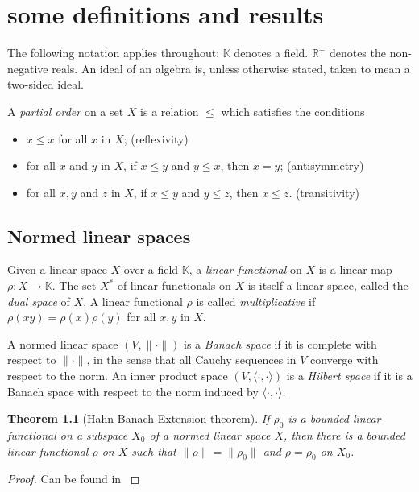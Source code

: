 \documentclass[12pt,a4paper]{report}
\theoremstyle{plain}
\newtheorem*{thm*}{Theorem}
\theoremstyle{definition}
\newcommand{\1}{\mathbbm{1}}
\newcommand{\R}{\mathbb{R}}
\renewcommand{\H}{\mathcal{H}}
\newcommand{\B}{\mathcal{B}}
\newcommand{\BH}{\mathcal{\B(\H)}}
\begin{document}


\chapter{some definitions and results}


The following notation applies throughout:
$\mathbb{K}$ denotes a field. $\R^+$ denotes the non-negative reals. An ideal of an algebra is, unless otherwise stated, taken to mean a two-sided ideal. 

A \emph{partial order} on a set $X$ is a relation $\leq$ which satisfies the conditions
\begin{itemize}
	\item $x \leq x$ for all $x$ in $X$; 		\hfill (reflexivity)
	\item for all $x$ and $y$ in $X$, if $x \leq y$ and $y\leq x$, then $x=y$; 
												\hfill (antisymmetry)
	\item for all $x,y$ and $z$ in $X$, if $x \leq y$ and $y\leq z$, then $x\leq z$. 
												\hfill (transitivity)
\end{itemize}

\section{Normed linear spaces}

Given a linear space $X$ over a field $\mathbb K$, a \emph{linear functional} on $X$ is a linear map 
$\rho:X\to\mathbb K$. The set $X^\ast$ of linear functionals on $X$ is itself a linear space, called
the \emph{dual space} of $X$. A linear functional $\rho$ is called \emph{multiplicative} if $\rho(xy) = \rho(x)\rho(y)$ for all $x,y$ in $X$.

A normed linear space $(V,\|\cdot\|)$ is a \emph{Banach space} if it is complete with respect to 
$\|\cdot\|$, in the sense that all Cauchy sequences in $V$ converge with respect to the norm. An inner 
product space $(V,\langle\cdot,\cdot\rangle)$ is a \emph{Hilbert space} if it is a Banach space with 
respect to the norm induced by $\langle\cdot,\cdot\rangle$.

\begin{thm*}[Hahn-Banach Extension theorem] 
	If $\rho_0$ is a bounded linear functional on a subspace $X_0$ of a normed linear space $X$,
	then there is a bounded linear functional $\rho$ on $X$ such that $\|\rho\|=\|\rho_0\|$ and 
	$\rho=\rho_0$ on $X_0$.
\end{thm*}
\begin{proof}
	Can be found in \cite[Theorem 1.6.1, p.~44]{kadison83}
\end{proof}
\end{document}
